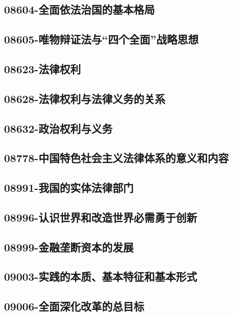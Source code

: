 \subsection{08604-全面依法治国的基本格局}

\subsection{08605-唯物辩证法与“四个全面”战略思想}

\subsection{08623-法律权利}

\subsection{08628-法律权利与法律义务的关系}

\subsection{08632-政治权利与义务}

\subsection{08778-中国特色社会主义法律体系的意义和内容}

\subsection{08991-我国的实体法律部门}

\subsection{08996-认识世界和改造世界必需勇于创新}

\subsection{08999-金融垄断资本的发展}

\subsection{09003-实践的本质、基本特征和基本形式}

\subsection{09006-全面深化改革的总目标}

